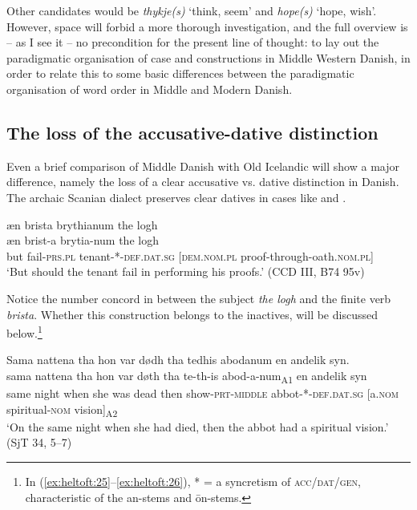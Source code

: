 \documentclass[output=paper]{langscibook}
\begin{document}
Other candidates would be \textit{thykje(s)} ‘think, seem' and \textit{hope(s)} ‘hope, wish'.  However, space will forbid a more thorough investigation, and the full overview is – as I see it – no precondition for the present line of thought: to lay out the paradigmatic organisation of case and constructions in Middle Western Danish, in order to relate this to some basic differences between the paradigmatic organisation of word order in Middle and Modern Danish.

\subsection{The loss of the accusative-dative distinction} \label{heltoft:2.5}

Even a brief comparison of Middle Danish with Old Icelandic will show a major difference, namely the loss of a clear accusative vs. dative distinction in Danish. The archaic Scanian dialect preserves clear datives in cases like  and .

\ea    \label{ex:heltoft:25}
    \glll æn   brista   brythianum\textsubscript{} the logh\\
          æn   brist-a       brytia-num\textsubscript{} the logh\\
          but  fail-\textsc{prs.pl}   tenant-*-\textsc{def.dat.sg}     [\textsc{dem.nom.pl} proof\nobreakdash-through\nobreakdash-oath.\textsc{nom.pl]}\\
    \glt ‘But should the tenant fail in performing his proofs.' (CCD III, B74 95v)
\z

Notice the number concord in  between the subject \textit{the logh} and the finite verb \textit{brista}. Whether this construction belongs to the inactives, will be discussed below.\footnote{In (\ref{ex:heltoft:25}--\ref{ex:heltoft:26}), * = a syncretism of \textsc{acc/dat/gen}, characteristic of the an-stems and ōn-stems.}


\ea \label{ex:heltoft:26} 
    \glll Sama nattena tha hon var dødh tha tedhis abodanum en andelik syn.\\
        sama nattena tha hon var døth tha  te-th-is abod-a-num\textsubscript{A1} en andelik syn\\
        same night when she was dead then   show-\textsc{prt-middle}   abbot-*-\textsc{def.dat.sg} {}[a.\textsc{nom}   spiritual-\textsc{nom}     vision]\textsubscript{A2}\\
    \glt ‘On the same night when she had died, then the abbot had a spiritual vision.' (SjT 34, 5–7)
\z
\end{document}
